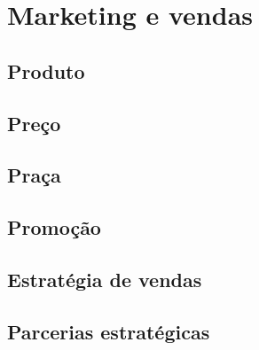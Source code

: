 \chapter{Marketing e vendas}

\cite{moore2010marketing}

\cite{chiavenato2004introduçao}

\section{Produto}

\section{Preço}

\section{Praça}

\section{Promoção}

\section{Estratégia de vendas}

\section{Parcerias estratégicas}

